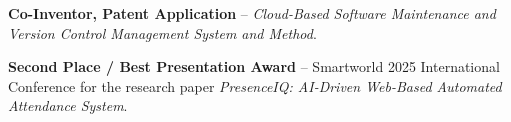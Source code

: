 \begin{cvlist}
    \item \textbf{Co-Inventor, Patent Application} -- \textit{Cloud-Based Software Maintenance and Version Control Management System and Method}.
    \item \textbf{Second Place / Best Presentation Award} -- Smartworld 2025 International Conference for the research paper \textit{PresenceIQ: AI-Driven Web-Based Automated Attendance System}.
\end{cvlist}
